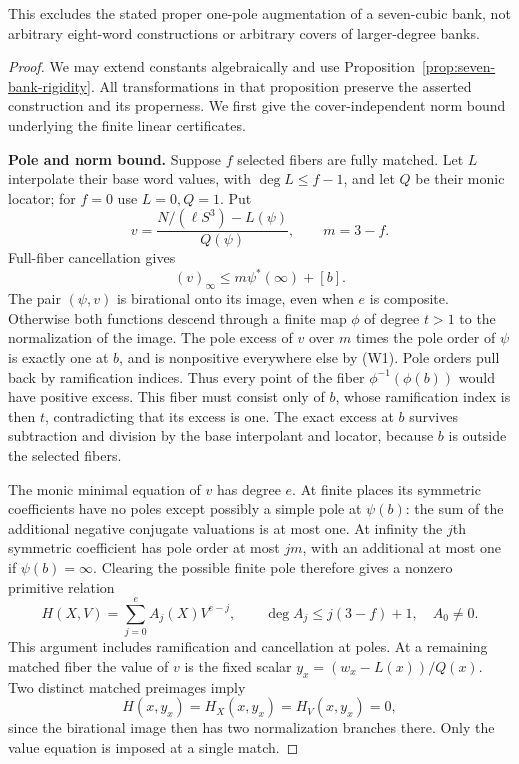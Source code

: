 This excludes the stated proper one-pole augmentation of a seven-cubic
bank, not arbitrary eight-word constructions or arbitrary covers of
larger-degree banks.

\begin{proof}
We may extend constants algebraically and use
Proposition~\ref{prop:seven-bank-rigidity}.  All transformations in that
proposition preserve the asserted construction and its properness.
We first give the cover-independent norm bound underlying the finite
linear certificates.

\smallskip\noindent\textbf{Pole and norm bound.}
Suppose $f$ selected fibers are fully matched.  Let $L$ interpolate
their base word values, with $\deg L\le f-1$, and let $Q$ be their
monic locator; for $f=0$ use $L=0,Q=1$.  Put
\[
 v=\frac{N/(\ell S^3)-L(\psi)}{Q(\psi)},\qquad m=3-f.
\]
Full-fiber cancellation gives
\[
 (v)_\infty\le m\psi^*(\infty)+[b].                 \tag{W1}
\]
The pair $(\psi,v)$ is birational onto its image, even when $e$ is
composite.  Otherwise both functions descend through a finite map
$\phi$ of degree $t>1$ to the normalization of the image.  The pole
excess of $v$ over $m$ times the pole order of $\psi$ is exactly one
at $b$, and is nonpositive everywhere else by (W1).  Pole orders pull
back by ramification indices.  Thus every point of the fiber
$\phi^{-1}(\phi(b))$ would have positive excess.  This fiber must
consist only of $b$, whose ramification index is then $t$, contradicting
that its excess is one.  The exact excess at $b$ survives subtraction
and division by the base interpolant and locator, because $b$ is
outside the selected fibers.

The monic minimal equation of $v$ has degree $e$.  At finite places its
symmetric coefficients have no poles except possibly a simple pole at
$\psi(b)$: the sum of the additional negative conjugate valuations is
at most one.  At infinity the $j$th symmetric coefficient has pole
order at most $jm$, with an additional at most one if $\psi(b)=\infty$.
Clearing the possible finite pole therefore gives a nonzero primitive
relation
\[
 H(X,V)=\sum_{j=0}^e A_j(X)V^{e-j},\qquad
 \deg A_j\le j(3-f)+1,
 \quad A_0\ne0.                                      \tag{W2}
\]
This argument includes ramification and cancellation at poles.
At a remaining matched fiber the value of $v$ is the fixed scalar
$y_x=(w_x-L(x))/Q(x)$.  Two distinct matched preimages imply
\[
 H(x,y_x)=H_X(x,y_x)=H_V(x,y_x)=0,                     \tag{W3}
\]
since the birational image then has two normalization branches there.
Only the value equation is imposed at a single match.



\end{proof}
